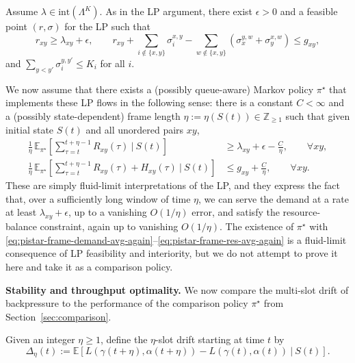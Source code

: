 \documentclass[11pt]{article}
\newcommand{\E}{\mathbb{E}}
\begin{document}
Assume $\lambda\in\mathrm{int}(\Lambda^K)$.  As in the LP argument,
there exist $\epsilon>0$ and a feasible point $(r,\sigma)$ for the LP
such that
\[
r_{xy} \ge \lambda_{xy}+\epsilon,\qquad
r_{xy} +\sum_{i\notin\{x,y\}}\sigma_i^{x,y}
-\sum_{w\notin\{x,y\}}(\sigma_x^{y,w}+\sigma_y^{x,w}) \le g_{xy}
,
\]
and $\sum_{y<y'}\sigma_i^{y,y'}\le K_i$ for all $i$.

We now assume that there exists a (possibly queue-aware) Markov policy $\pi^\star$ that implements these LP flows in the
following sense: there is a constant $C<\infty$ and a (possibly
state-dependent) frame length $\eta :=\eta(S(t)) \in\mathbb{Z}_{\ge 1}$ such that
given initial state $S(t)$ and all unordered pairs $xy$,
\begin{align}
\frac{1}{\eta}\,
\E_{\pi^\star}\!\left[
\sum_{\tau=t}^{t+\eta-1}
R_{xy}(\tau)
\ \Big|\ S(t)
\right]
&\ge
\lambda_{xy}+\epsilon
-\frac{C}{\eta},
\qquad \forall xy,
\label{eq:pistar-frame-demand-avg-again}\\[1mm]
\frac{1}{\eta}\,
\E_{\pi^\star}\!\left[
\sum_{\tau=t}^{t+\eta-1}
R_{xy}(\tau)+H_{xy}(\tau)
\ \Big|\ S(t)
\right]
&\le g_{xy}+\frac{C}{\eta},
\qquad \forall xy.
\label{eq:pistar-frame-res-avg-again}
\end{align}
These are simply fluid-limit interpretations of the LP, and they express the fact that, over a sufficiently long window of time $\eta$, we can serve the demand at a rate at least
$\lambda_{xy}+\epsilon$, up to a vanishing $O(1/\eta)$ error, and 
satisfy the resource-balance constraint, again up to vanishing $O(1/\eta)$. 
The existence of
$\pi^\star$ with
\eqref{eq:pistar-frame-demand-avg-again}--\eqref{eq:pistar-frame-res-avg-again}
is a fluid-limit consequence of LP feasibility and interiority, but we do not attempt to prove it here and take it as a comparison policy.

\textbf{Stability and throughput optimality.} 
We now compare the multi-slot drift of backpressure to the
performance of the comparison policy $\pi^\star$ from
Section~\ref{sec:comparison}.


Given an integer $\eta\ge 1$, define the $\eta$-slot drift
starting at time $t$ by
\begin{equation}
\Delta_\eta(t)
:=
\E\!\left[
L(\gamma(t{+}\eta),\alpha(t{+}\eta))
-
L(\gamma(t),\alpha(t))
\ \Big|\ S(t)
\right].
\label{eq:Delta-eta-def}
\end{equation}
\end{document}
